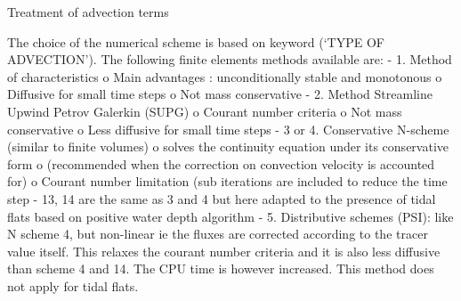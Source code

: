 Treatment of advection terms

The choice of the numerical scheme is based on keyword (`TYPE OF
ADVECTION'). The following finite elements methods available are:\newline
-\hspace{5mm} 1. Method of characteristics \newline
o\hspace{5mm} Main advantages : unconditionally stable and monotonous\newline
o\hspace{5mm} Diffusive for small time steps\newline
o\hspace{5mm} Not mass conservative\newline
-\hspace{5mm} 2. Method Streamline Upwind Petrov Galerkin (SUPG)\newline
o\hspace{5mm} Courant number criteria\newline
o\hspace{5mm} Not mass conservative\newline
o\hspace{5mm} Less diffusive for small time steps\newline
-\hspace{5mm} 3 or 4. Conservative N-scheme (similar to finite volumes)%
\newline
o\hspace{5mm} solves the continuity equation under its conservative form%
\newline
o\hspace{5mm} (recommended when the correction on convection velocity is
accounted for)\newline
o\hspace{5mm} Courant number limitation (sub iterations are included to
reduce the time step\newline
-\hspace{5mm} 13, 14 are the same as 3 and 4 but here adapted to the
presence of tidal flats based on positive water depth algorithm \newline
-\hspace{5mm} 5. Distributive schemes (PSI): like N scheme 4, but non-linear
ie the fluxes are corrected according to the tracer value itself. This
relaxes the courant number criteria and it is also less diffusive than
scheme 4 and 14. The CPU time is however increased. This method does not
apply for tidal flats.

